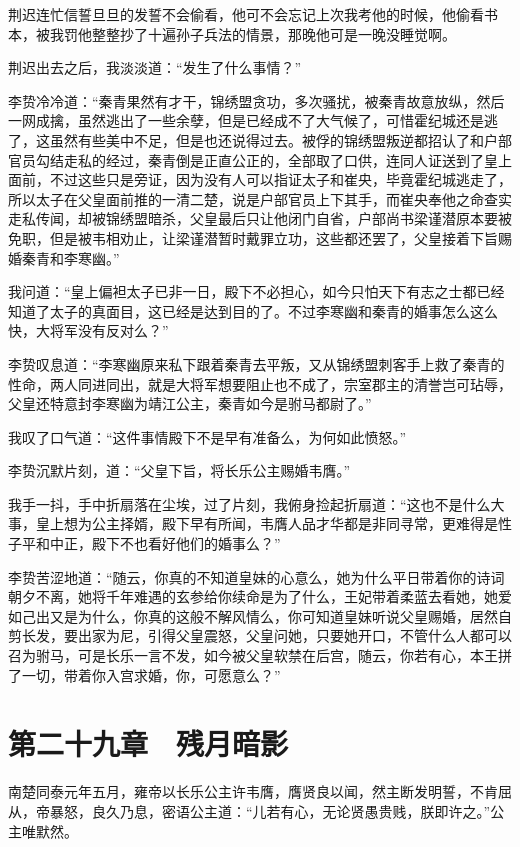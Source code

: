 荆迟连忙信誓旦旦的发誓不会偷看，他可不会忘记上次我考他的时候，他偷看书本，被我罚他整整抄了十遍孙子兵法的情景，那晚他可是一晚没睡觉啊。

荆迟出去之后，我淡淡道：“发生了什么事情？”

李贽冷冷道：“秦青果然有才干，锦绣盟贪功，多次骚扰，被秦青故意放纵，然后一网成擒，虽然逃出了一些余孽，但是已经成不了大气候了，可惜霍纪城还是逃了，这虽然有些美中不足，但是也还说得过去。被俘的锦绣盟叛逆都招认了和户部官员勾结走私的经过，秦青倒是正直公正的，全部取了口供，连同人证送到了皇上面前，不过这些只是旁证，因为没有人可以指证太子和崔央，毕竟霍纪城逃走了，所以太子在父皇面前推的一清二楚，说是户部官员上下其手，而崔央奉他之命查实走私传闻，却被锦绣盟暗杀，父皇最后只让他闭门自省，户部尚书梁谨潜原本要被免职，但是被韦相劝止，让梁谨潜暂时戴罪立功，这些都还罢了，父皇接着下旨赐婚秦青和李寒幽。”

我问道：“皇上偏袒太子已非一日，殿下不必担心，如今只怕天下有志之士都已经知道了太子的真面目，这已经是达到目的了。不过李寒幽和秦青的婚事怎么这么快，大将军没有反对么？”

李贽叹息道：“李寒幽原来私下跟着秦青去平叛，又从锦绣盟刺客手上救了秦青的性命，两人同进同出，就是大将军想要阻止也不成了，宗室郡主的清誉岂可玷辱，父皇还特意封李寒幽为靖江公主，秦青如今是驸马都尉了。”

我叹了口气道：“这件事情殿下不是早有准备么，为何如此愤怒。”

李贽沉默片刻，道：“父皇下旨，将长乐公主赐婚韦膺。”

我手一抖，手中折扇落在尘埃，过了片刻，我俯身捡起折扇道：“这也不是什么大事，皇上想为公主择婿，殿下早有所闻，韦膺人品才华都是非同寻常，更难得是性子平和中正，殿下不也看好他们的婚事么？”

李贽苦涩地道：“随云，你真的不知道皇妹的心意么，她为什么平日带着你的诗词朝夕不离，她将千年难遇的玄参给你续命是为了什么，王妃带着柔蓝去看她，她爱如己出又是为什么，你真的这般不解风情么，你可知道皇妹听说父皇赐婚，居然自剪长发，要出家为尼，引得父皇震怒，父皇问她，只要她开口，不管什么人都可以召为驸马，可是长乐一言不发，如今被父皇软禁在后宫，随云，你若有心，本王拼了一切，带着你入宫求婚，你，可愿意么？”

\chapter{第二十九章　残月暗影}

南楚同泰元年五月，雍帝以长乐公主许韦膺，膺贤良以闻，然主断发明誓，不肯屈从，帝暴怒，良久乃息，密语公主道：“儿若有心，无论贤愚贵贱，朕即许之。”公主唯默然。

